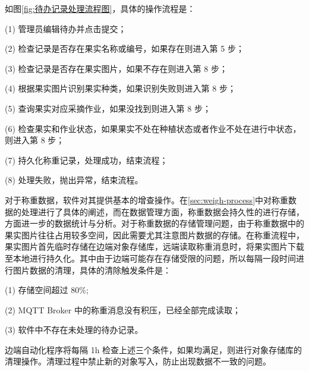 如图\ref{fig:待办记录处理流程图}，具体的操作流程是：

(1) 管理员编辑待办并点击提交；

(2) 检查记录是否存在果实名称或编号，如果存在则进入第 5 步；

(3) 检查记录是否存在果实图片，如果不存在则进入第 8 步；

(4) 根据果实图片识别果实种类，如果识别失败则进入第 8 步；

(5) 查询果实对应采摘作业，如果没找到则进入第 8 步；

(6) 检查果实和作业状态，如果果实不处在种植状态或者作业不处在进行中状态，则进入第 8 步；

(7) 持久化称重记录，处理成功，结束流程；

(8) 处理失败，抛出异常，结束流程。

对于称重数据，软件对其提供基本的增查操作。在\ref{sec:weigh-process}中对称重数据的处理进行了具体的阐述，而在数据管理方面，称重数据会持久性的进行存储，方面进一步的数据统计与分析。对于称重数据的存储管理问题，由于称重数据中的果实图片往往占用较多空间，因此需要尤其注意图片数据的存储。在称重流程中，果实图片首先临时存储在边端对象存储库，远端读取称重消息时，将果实图片下载至本地进行持久化。其中由于边端可能存在存储受限的问题，所以每隔一段时间进行图片数据的清理，具体的清除触发条件是：

(1) 存储空间超过 80\%;

(2) MQTT Broker 中的称重消息没有积压，已经全部完成读取；

(3) 软件中不存在未处理的待办记录。

边端自动化程序将每隔 1h 检查上述三个条件，如果均满足，则进行对象存储库的清理操作。清理过程中禁止新的对象写入，防止出现数据不一致的问题。



